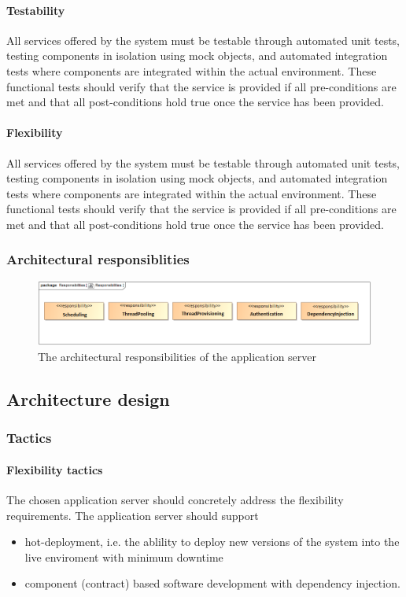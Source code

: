 \documentclass[a4paper,12pt]{report}
\begin{document}
\paragraph {Testability}
\hfill \break
All services offered by the system must be testable through automated unit tests, testing components in isolation using mock objects, and automated integration tests where components are integrated within the actual environment.
These functional tests should verify that the service is provided if all pre-conditions are met and that all post-conditions hold true once the service has been provided.

\paragraph {Flexibility}
\hfill \break
All services offered by the system must be testable through automated unit tests, testing components in isolation using mock objects, and automated integration tests where components are integrated within the actual environment.
These functional tests should verify that the service is provided if all pre-conditions are met and that all post-conditions hold true once the service has been provided.

\subsubsection {Architectural responsiblities}

	\begin{figure}[htb]
		\centering
		\includegraphics  [scale=0.5]{../Diagrams/applicationServerResponsibiltiesZ.png}
		\caption{The architectural responsibilities of the application server}
	\end{figure}


\subsection {Architecture design}
\subsubsection {Tactics}
\paragraph {Flexibility tactics}
\hfill \break
The chosen application server should concretely address the flexibility requirements. The application server should support 
	\begin {itemize}
		\item hot-deployment, i.e. the ablility to deploy new versions of the system into the live enviroment with minimum downtime
		\item component (contract) based software development with dependency injection.
	\end {itemize}
 
\end{document}
